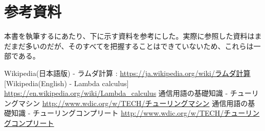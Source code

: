 {	\section{参考資料}{
		本書を執筆するにあたり、下に示す資料を参考にした。実際に参照した資料はまだまだ多いのだが、そのすべてを把握することはできていないため、これらは一部である。

		\begin{thebibliography}{9}
			Wikipedia(日本語版) - ラムダ計算 : \url{https://ja.wikipedia.org/wiki/ラムダ計算}
			[Wikipedia(English) - Lambda calculus] \url{https://en.wikipedia.org/wiki/Lambda_calculus}
			通信用語の基礎知識 - チューリングマシン \url{http://www.wdic.org/w/TECH/チューリングマシン}
			通信用語の基礎知識 - チューリングコンプリート \url{http://www.wdic.org/w/TECH/チューリングコンプリート}
		\end{thebibliography}

	}
}
